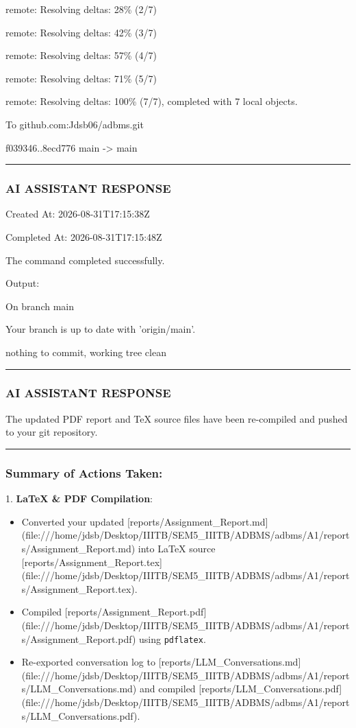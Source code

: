 \documentclass[11pt,a4paper]{article}
\begin{document}
remote: Resolving deltas:  28\% (2/7)

remote: Resolving deltas:  42\% (3/7)

remote: Resolving deltas:  57\% (4/7)

remote: Resolving deltas:  71\% (5/7)

remote: Resolving deltas: 100\% (7/7), completed with 7 local objects.

To github.com:Jdsb06/adbms.git

f039346..8ecd776  main -> main


\hrule

\subsubsection{AI ASSISTANT RESPONSE}

Created At: 2026-08-31T17:15:38Z

Completed At: 2026-08-31T17:15:48Z


The command completed successfully.

Output:

On branch main

Your branch is up to date with 'origin/main'.


nothing to commit, working tree clean


\hrule

\subsubsection{AI ASSISTANT RESPONSE}

The updated PDF report and TeX source files have been re-compiled and pushed to your git repository.


\hrule


\subsubsection{Summary of Actions Taken:}
1. \textbf{LaTeX \& PDF Compilation}:

\begin{itemize}
\item Converted your updated [reports/Assignment\_Report.md](file:///home/jdsb/Desktop/IIITB/SEM5\_IIITB/ADBMS/adbms/A1/reports/Assignment\_Report.md) into LaTeX source [reports/Assignment\_Report.tex](file:///home/jdsb/Desktop/IIITB/SEM5\_IIITB/ADBMS/adbms/A1/reports/Assignment\_Report.tex).
\item Compiled [reports/Assignment\_Report.pdf](file:///home/jdsb/Desktop/IIITB/SEM5\_IIITB/ADBMS/adbms/A1/reports/Assignment\_Report.pdf) using \texttt{pdflatex}.
\item Re-exported conversation log to [reports/LLM\_Conversations.md](file:///home/jdsb/Desktop/IIITB/SEM5\_IIITB/ADBMS/adbms/A1/reports/LLM\_Conversations.md) and compiled [reports/LLM\_Conversations.pdf](file:///home/jdsb/Desktop/IIITB/SEM5\_IIITB/ADBMS/adbms/A1/reports/LLM\_Conversations.pdf).
\end{itemize}
\end{document}
